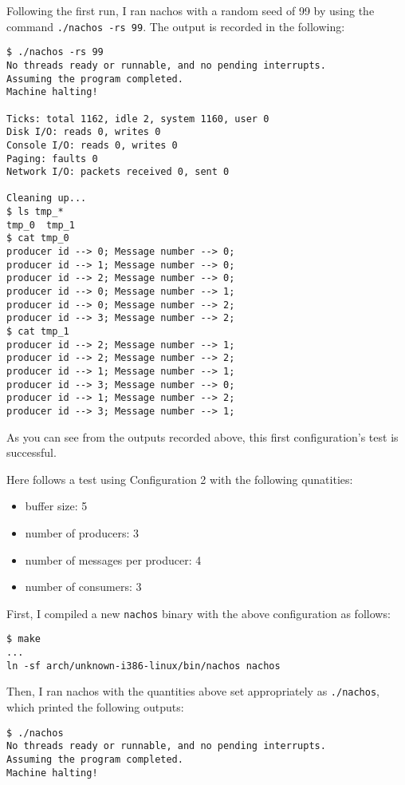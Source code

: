 \documentclass[11pt]{article}
\begin{document}
\begin{question}
\begin{subquestion}
        Following the first run, I ran nachos with a random seed of 99 by using the command {\tt ./nachos -rs 99}. The output is recorded in the following:

        \begin{verbatim}
$ ./nachos -rs 99
No threads ready or runnable, and no pending interrupts.
Assuming the program completed.
Machine halting!

Ticks: total 1162, idle 2, system 1160, user 0
Disk I/O: reads 0, writes 0
Console I/O: reads 0, writes 0
Paging: faults 0
Network I/O: packets received 0, sent 0

Cleaning up...
$ ls tmp_*
tmp_0  tmp_1
$ cat tmp_0
producer id --> 0; Message number --> 0;
producer id --> 1; Message number --> 0;
producer id --> 2; Message number --> 0;
producer id --> 0; Message number --> 1;
producer id --> 0; Message number --> 2;
producer id --> 3; Message number --> 2;
$ cat tmp_1
producer id --> 2; Message number --> 1;
producer id --> 2; Message number --> 2;
producer id --> 1; Message number --> 1;
producer id --> 3; Message number --> 0;
producer id --> 1; Message number --> 2;
producer id --> 3; Message number --> 1;
        \end{verbatim}

        As you can see from the outputs recorded above, this first configuration's test is successful.

    \end{subquestion}
    \begin{subquestion}

        Here follows a test using Configuration 2 with the following qunatities:
        \begin{itemize}
            \item{buffer size: 5}
            \item{number of producers: 3}
            \item{number of messages per producer: 4}
            \item{number of consumers: 3}
        \end{itemize}

        First, I compiled a new {\tt nachos} binary with the above configuration as follows:

        \begin{verbatim}
$ make
...
ln -sf arch/unknown-i386-linux/bin/nachos nachos
        \end{verbatim}

        Then, I ran nachos with the quantities above set appropriately as {\tt ./nachos}, which printed the following outputs:
        \begin{verbatim}
$ ./nachos
No threads ready or runnable, and no pending interrupts.
Assuming the program completed.
Machine halting!


\end{verbatim}
\end{subquestion}
\end{question}
\end{document}
